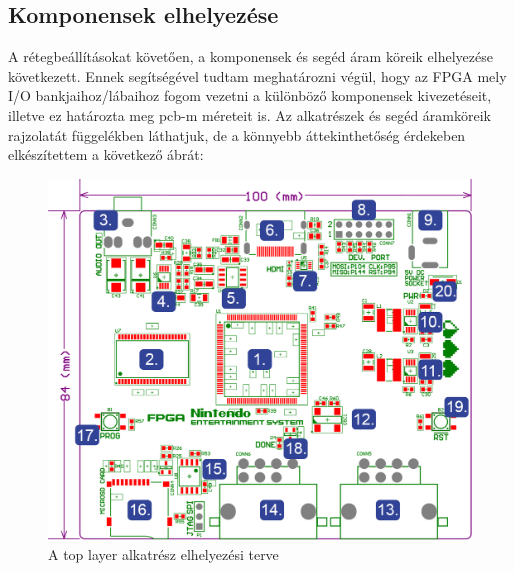 	\subsection{Komponensek elhelyezése}
	
	A rétegbeállításokat követően, a komponensek és segéd áram köreik elhelyezése következett. Ennek segítségével tudtam meghatározni végül, hogy az FPGA mely I/O bankjaihoz/lábaihoz fogom vezetni a különböző komponensek kivezetéseit, illetve ez határozta meg pcb-m méreteit is. Az alkatrészek és segéd áramköreik rajzolatát  függelékben láthatjuk, de a könnyebb áttekinthetőség érdekeben elkészítettem a következő ábrát:
	
	\begin{figure}[H]
		\centering
		\includegraphics[width=135mm, keepaspectratio]{figures/components-top}
		\caption{A top layer alkatrész elhelyezési terve} 
		\label{fig:NES-components-top}
	\end{figure}
	
